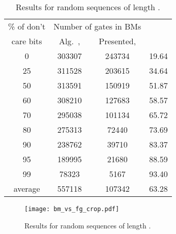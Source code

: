 \documentclass[10pt,conference]{IEEEtran}
\begin{document}
\begin{table}[t!]\centering\footnotesize
\begin{tabular}{|c|c|c|c|} \hline               
\% of  don't &  \multicolumn{2}{c|}{Number of gates in BMs} & \multirow{2}{*}{} \\ \cline{2-3}
care bits & Alg.~\cite{Du11a}, 	& Presented,  &    \\ \hline
0       &       303307  &       243734  &       19.64     \\
25      &       311528  &       203615  &       34.64     \\
50      &       313591  &       150919  &       51.87    \\
60      &       308210  &       127683  &       58.57     \\
70      &       295038  &       101134  &       65.72     \\
80      &       275313  &       72440   &       73.69     \\
90      &       238762  &       39710   &       83.37     \\
95      &       189995  &       21680   &       88.59      \\
99      &       78323   &       5167    &       93.40     \\  \hline
average & 557118 & 107342 & 63.28 \\ \hline
\end{tabular}
\caption{Results for random sequences of length .}
\label{ta1}
\end{table}

\begin{figure}[t!]
\begin{center}
    \texttt{[image: bm\_vs\_fg\_crop.pdf]}
\caption{Results for random sequences of length .}\label{ff}
\end{center}
\end{figure}
\end{document}
